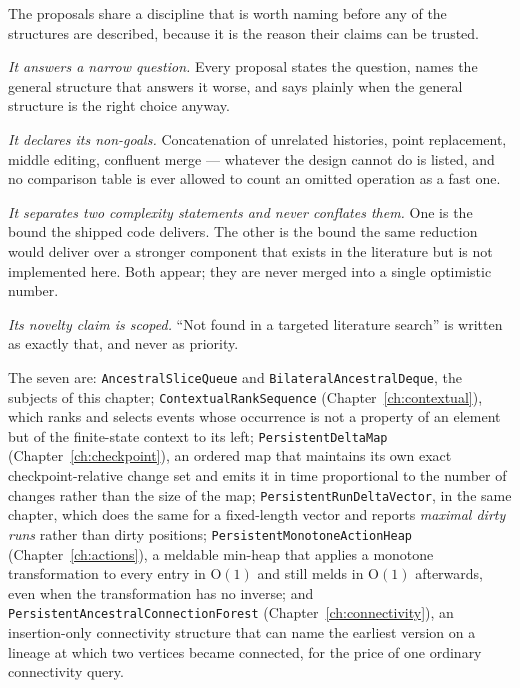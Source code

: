 \documentclass[11pt,twoside,openright]{book}
\newcommand{\code}[1]{\texorpdfstring{\textcolor{d7ink}{\texttt{#1}}}{#1}}
\newcommand{\bigoh}[1]{$\mathrm{O}(#1)$}
\begin{document}
The proposals share a discipline that is worth naming before any of the
structures are described, because it is the reason their claims can be trusted.

\begin{contractbox}
\emph{It answers a narrow question.} Every proposal states the question, names
the general structure that answers it worse, and says plainly when the general
structure is the right choice anyway.

\emph{It declares its non-goals.} Concatenation of unrelated histories, point
replacement, middle editing, confluent merge --- whatever the design cannot do
is listed, and no comparison table is ever allowed to count an omitted
operation as a fast one.

\emph{It separates two complexity statements and never conflates them.} One is
the bound the shipped code delivers. The other is the bound the same reduction
would deliver over a stronger component that exists in the literature but is not
implemented here. Both appear; they are never merged into a single optimistic
number.

\emph{Its novelty claim is scoped.} ``Not found in a targeted literature
search'' is written as exactly that, and never as priority.
\end{contractbox}

The seven are: \code{AncestralSliceQueue} and \code{BilateralAncestralDeque},
the subjects of this chapter; \code{ContextualRankSequence} (Chapter~\ref{ch:contextual}), which ranks and
selects events whose occurrence is not a property of an element but of the
finite-state context to its left; \code{PersistentDeltaMap} (Chapter~\ref{ch:checkpoint}), an ordered map that
maintains its own exact checkpoint-relative change set and emits it in time
proportional to the number of changes rather than the size of the map;
\code{PersistentRunDeltaVector}, in the same chapter, which does the same for a
fixed-length vector
and reports \emph{maximal dirty runs} rather than dirty positions;
\code{PersistentMonotoneActionHeap} (Chapter~\ref{ch:actions}), a meldable min-heap
that applies a monotone
transformation to every entry in \bigoh{1} and still melds in \bigoh{1}
afterwards, even when the transformation has no inverse; and
\code{PersistentAncestralConnectionForest} (Chapter~\ref{ch:connectivity}), an
insertion-only connectivity
structure that can name the earliest version on a lineage at which two vertices
became connected, for the price of one ordinary connectivity query.
\end{document}
